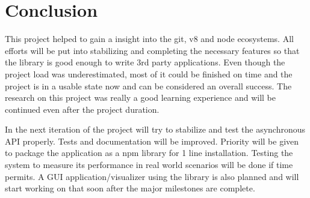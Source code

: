 \chapter{Conclusion}

This project helped to gain a insight into the git, v8 and node ecosystems. All
efforts will be put into stabilizing and completing the necessary features so
that the library is good enough to write 3rd party applications. Even though the
project load was underestimated, most of it could be finished on time and the
project is in a usable state now and can be considered an overall success. The
research on this project was really a good learning experience and will be
continued even after the project duration.

In the next iteration of the project will try to stabilize and test the
asynchronous API properly. Tests and documentation will be improved. Priority
will be given to package the application as a npm library for 1 line
installation. Testing the system to measure its performance in real world
scenarios will be done if time permits. A GUI application/visualizer using the
library is also planned and will start working on that soon after the major
milestones are complete.
